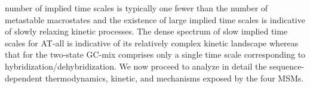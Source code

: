 \documentclass[journal=jpcbfk,manuscript=article]{achemso}
\begin{document}
number of implied time scales is typically one fewer than the number of metastable macrostates and the existence of large implied time scales is indicative of slowly relaxing kinetic processes. The dense spectrum of slow implied time scales for AT-all is indicative of its relatively complex kinetic landscape whereas that for the two-state GC-mix comprises only a single time scale corresponding to hybridization/dehybridization. We now proceed to analyze in detail the sequence-dependent thermodynamics, kinetic, and mechanisms exposed by the four MSMs.




\end{document}
